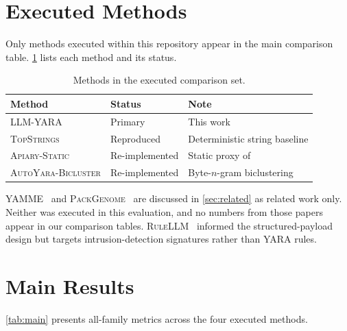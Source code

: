 \documentclass[10pt,twocolumn]{article}
\newcommand{\sysname}{\textsc{LLM-YARA}\xspace}
\newcommand{\topstrings}{\textsc{TopStrings}\xspace}
\newcommand{\apiary}{\textsc{Apiary-Static}\xspace}
\newcommand{\autoyara}{\textsc{AutoYara-Bicluster}\xspace}
\newcommand{\yamme}{\textsc{YAMME}\xspace}
\newcommand{\packgenome}{\textsc{PackGenome}\xspace}
\newcommand{\rulellm}{\textsc{RuleLLM}\xspace}
\begin{document}
\section{Executed Methods}
\label{sec:comparison}

Only methods executed within this repository appear in the main
comparison table.  \cref{tab:methods} lists each method and its
status.

\begin{table}[H]
\centering
\caption{Methods in the executed comparison set.}
\label{tab:methods}
\small
\begin{tabularx}{\columnwidth}{@{}llX@{}}
\toprule
\textbf{Method} & \textbf{Status} & \textbf{Note} \\
\midrule
\sysname           & Primary        & This work \\
\topstrings        & Reproduced     & Deterministic string baseline \\
\apiary            & Re-implemented & Static proxy of~\cite{apiary2023ccs} \\
\autoyara          & Re-implemented & Byte-$n$-gram biclustering \\
\bottomrule
\end{tabularx}
\end{table}

\yamme~\cite{yamme2023} and \packgenome~\cite{packgenome2023ccs} are
discussed in \cref{sec:related} as related work only.  Neither was
executed in this evaluation, and no numbers from those papers appear in
our comparison tables.  \rulellm~\cite{rulellm2025} informed the
structured-payload design but targets intrusion-detection signatures
rather than YARA rules.

\section{Main Results}
\label{sec:results}

\cref{tab:main} presents all-family metrics across the four executed
methods.
\end{document}
